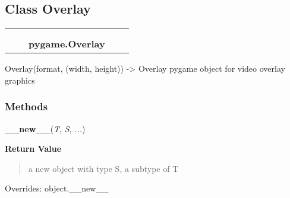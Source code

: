 

\subsection{Class Overlay}

    \label{pygame:Overlay}
\begin{tabular}{cccccc}
\multicolumn{2}{r}{\settowidth{\BCL}{object}\multirow{2}{\BCL}{object}}
&&
  \\\cline{3-3}
  &&\multicolumn{1}{c|}{}
&&
  \\
&&\multicolumn{2}{l}{\textbf{pygame.Overlay}}
\end{tabular}

Overlay(format, (width, height)) -{\textgreater} Overlay pygame object for 
video overlay graphics



  \subsubsection{Methods}

    \vspace{0.5ex}

\hspace{.8\funcindent}\begin{boxedminipage}{\funcwidth}

    \raggedright \textbf{\_\_new\_\_}(\textit{T}, \textit{S}, \textit{...})

\setlength{\parskip}{2ex}
\setlength{\parskip}{1ex}
      \textbf{Return Value}
    \vspace{-1ex}

      \begin{quote}
      a new object with type S, a subtype of T

      \end{quote}

      Overrides: object.\_\_new\_\_

    \end{boxedminipage}

